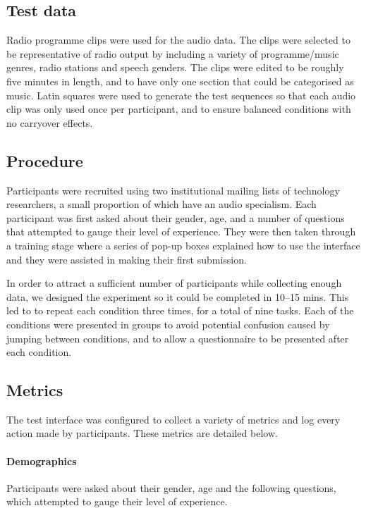 \subsection{Test data}
Radio programme clips were used for the audio data. The clips were selected to be representative of radio output by
including a variety of programme/music genres, radio stations and speech genders. The clips were edited to be roughly
five minutes in length, and to have only one section that could be categorised as music. Latin squares were used to
generate the test sequences so that each audio clip was only used once per participant, and to ensure balanced
conditions with no carryover effects.

\subsection{Procedure}
Participants were recruited using two institutional mailing lists of technology researchers, a small proportion of
which have an audio specialism. Each participant was first asked about their gender, age, and a number of questions
that attempted to gauge their level of experience. They were then taken through a training stage where a series of
pop-up boxes explained how to use the interface and they were assisted in making their first submission.

In order to attract a sufficient number of participants while collecting enough data, we designed the experiment so it
could be completed in 10--15 mins. This led to to repeat each condition three times, for a total of nine tasks.
Each of the conditions were presented in groups to avoid potential confusion caused by jumping between conditions, and
to allow a questionnaire to be presented after each condition.

\subsection{Metrics}
The test interface was configured to collect a variety of metrics and log every action made by participants. 
These metrics are detailed below.

\paragraph{Demographics}
Participants were asked about their gender, age and the following questions, which attempted to gauge their level of
experience.

